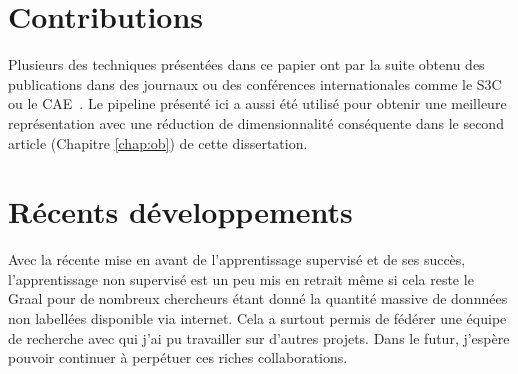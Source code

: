 \section{Contributions}

Plusieurs des techniques pr\'{e}sent\'{e}es dans ce papier ont par la suite
obtenu des publications dans des journaux ou des conf\'{e}rences
internationales comme le S3C~\citep{Courville+al-2011} ou le
CAE~\citep{Rifai+al-2011}. Le pipeline pr\'{e}sent\'{e} ici a aussi \'{e}t\'{e}
utilis\'{e} pour obtenir une meilleure repr\'{e}sentation avec une
r\'{e}duction de dimensionnalit\'{e} cons\'{e}quente dans le second article
(Chapitre \ref{chap:ob}) de cette dissertation. 

\section{R\'{e}cents d\'{e}veloppements}

Avec la r\'{e}cente mise en avant de l'apprentissage supervis\'{e} et de ses
succ\`{e}s, l'apprentissage non supervis\'{e} est un peu mis en retrait
m\^{e}me si cela reste le Graal pour de nombreux chercheurs \'{e}tant donn\'{e}
la quantit\'{e} massive de donnn\'{e}es non labell\'{e}es disponible via
internet. Cela a surtout permis de f\'{e}d\'{e}rer une \'{e}quipe de recherche
avec qui j'ai pu travailler sur d'autres projets. Dans le futur, j'esp\`{e}re
pouvoir continuer \`{a} perp\'{e}tuer ces riches collaborations.
